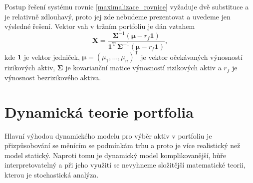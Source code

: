 \documentclass[a4paper,12pt]{report}
\theoremstyle{definition} \newtheorem{definice}[veta]{Definice}
\theoremstyle{remark}
\begin{document}
Postup řešení systému rovnic \eqref{maximalizace_rovnice} vyžaduje dvě substituce a je relativně zdlouhavý, proto jej zde nebudeme prezentovat a uvedeme jen výsledné řešení.
Vektor vah v tržním portfoliu  je dán vztahem
\begin{equation} \label{vahy_trzni}
\boldsymbol{X}=\frac{\boldsymbol{\Sigma}^{-1}\left(\boldsymbol{\mu}-r_f\boldsymbol{1}\right)}{\boldsymbol{1}^\mathrm{T}\,\boldsymbol{\Sigma}^{-1}\left(\boldsymbol{\mu}-r_f\boldsymbol{1}\right)},
\end{equation}
kde $\boldsymbol{1}$ je vektor jedniček, $\boldsymbol{\mu}=(\mu_1,\dots,\mu_n)^\mathrm{T}$ je vektor očekávaných výnosností rizikových aktiv, $\boldsymbol{\Sigma}$ je kovarianční matice výnosností rizikových aktiv a $r_f$ je výnosnost bezrizikového aktiva.



\section{Dynamická teorie portfolia}
Hlavní výhodou dynamického modelu pro výběr aktiv v portfoliu je přizpůsobování se měnícím se podmínkám trhu a proto je více realistický než model statický.
Naproti tomu je dynamický model komplikovanější, hůře interpretovatelný a při jeho využití se nevyhneme složitější matematické teorii, kterou je stochastická analýza.
\end{document}
